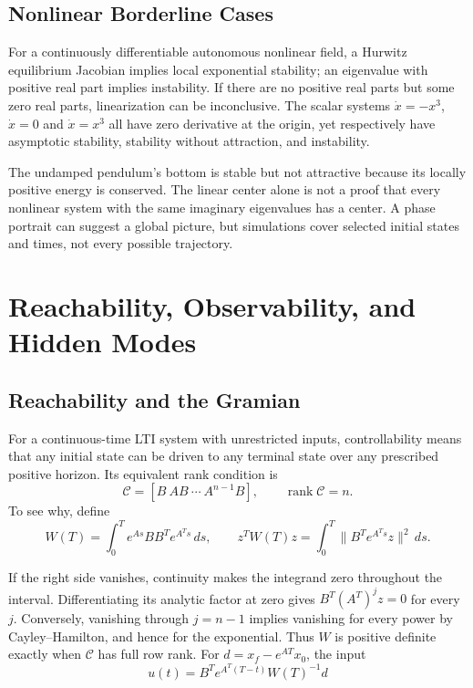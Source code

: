 \subsection{Nonlinear Borderline Cases}
\label{sec:nonlinear_phase}

For a continuously differentiable autonomous nonlinear field, a Hurwitz equilibrium Jacobian implies local exponential stability; an eigenvalue with positive real part implies instability. If there are no positive real parts but some zero real parts, linearization can be inconclusive. The scalar systems $\dot x=-x^3$, $\dot x=0$ and $\dot x=x^3$ all have zero derivative at the origin, yet respectively have asymptotic stability, stability without attraction, and instability.

The undamped pendulum's bottom is stable but not attractive because its locally positive energy is conserved. The linear center alone is not a proof that every nonlinear system with the same imaginary eigenvalues has a center. A phase portrait can suggest a global picture, but simulations cover selected initial states and times, not every possible trajectory.

\section{Reachability, Observability, and Hidden Modes}
\label{sec:controllability}

\subsection{Reachability and the Gramian}

For a continuous-time LTI system with unrestricted inputs, controllability means that any initial state can be driven to any terminal state over any prescribed positive horizon. Its equivalent rank condition is
\begin{equation}
\label{eq:controllability_matrix}
 \mathcal C=[B\ AB\ \cdots\ A^{n-1}B],\qquad \operatorname{rank}\mathcal C=n.
\end{equation}
\label{def:controllability_def}
\label{thm:controllability_rank}
\label{thm:kalman_controllability}
To see why, define
\begin{equation}
\label{eq:state_gramian}
 W(T)=\int_0^T e^{As}BB^Te^{A^Ts}\,ds,\qquad
 z^TW(T)z=\int_0^T\|B^Te^{A^Ts}z\|^2\,ds.
\end{equation}

If the right side vanishes, continuity makes the integrand zero throughout the interval. Differentiating its analytic factor at zero gives $B^T(A^T)^jz=0$ for every $j$. Conversely, vanishing through $j=n-1$ implies vanishing for every power by Cayley--Hamilton, and hence for the exponential. Thus $W$ is positive definite exactly when $\mathcal C$ has full row rank. For $d=x_f-e^{AT}x_0$, the input
\begin{equation}
\label{eq:state_steering}
 u(t)=B^Te^{A^T(T-t)}W(T)^{-1}d
\end{equation}

